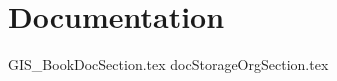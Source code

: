\documentclass[class=book , crop=false]{standalone}
\begin{document}
\chapter{Documentation}
{GIS_BookDocSection.tex}
\clearpage %
{docStorageOrgSection.tex}
\clearpage
\end{document}

